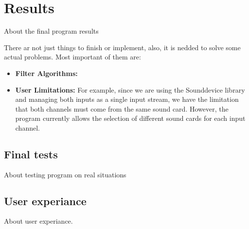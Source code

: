 \chapter{Results}

About the final program results

There ar not just things to finish or implement, also, it is nedded to solve some actual problems. Most important of them are:

\begin{itemize}
	\item \textbf{Filter Algorithms:}
	
	\item \textbf{User Limitations:} For example, since we are using the Sounddevice library and managing both inputs as a single input stream, we have the limitation that both channels must come from the same sound card. However, the program currently allows the selection of different sound cards for each input channel.
	
\end{itemize}

\section{Final tests}

About testing program on real situations

\section{User experiance}

About user experiance.


